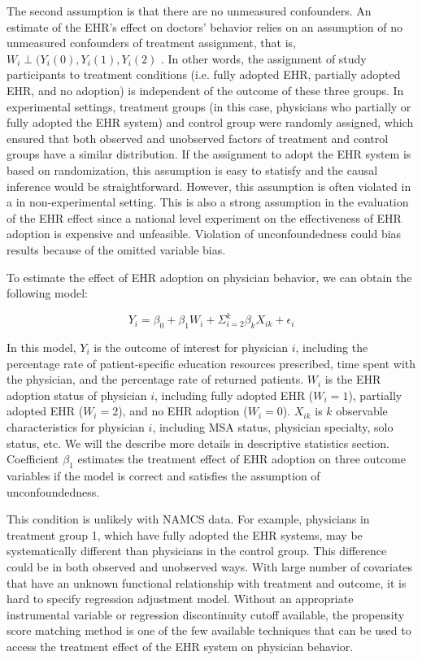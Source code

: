 \documentclass[12pt]{report}
\begin{document}
The second assumption is that there are no unmeasured confounders. An estimate of the EHR's effect on doctors' behavior relies on an assumption of no unmeasured confounders of treatment assignment, that is, $W_i \perp (Y_i(0),Y_i(1),Y_i(2)$ \citep{imbens2008recent}. In other words, the assignment of study participants to treatment conditions (i.e. fully adopted EHR, partially adopted EHR, and no adoption) is independent of the outcome of these three groups. In experimental settings, treatment groups (in this case, physicians who partially or fully adopted the EHR system) and control group were randomly assigned, which ensured that both observed and unobserved factors of treatment and control groups have a similar distribution. If the assignment to adopt the EHR system is based on randomization, this assumption is easy to statisfy and the causal inference would be straightforward. However, this assumption is often violated in a in non-experimental setting. This is also a strong assumption in the evaluation of the EHR effect since a national level experiment on the effectiveness of EHR adoption is expensive and unfeasible. Violation of unconfoundedness could bias results because of the omitted variable bias.

To estimate the effect of EHR adoption on physician behavior, we can obtain the following model:

\begin{equation*}
Y_{i} = \beta_0 + \beta_1 W_i + \Sigma^k_{i=2} \beta_k X_{ik} + \epsilon_{i}
\end{equation*}

In this model, $Y_{i}$ is the outcome of interest for physician $i$, including the percentage rate of patient-specific education resources prescribed, time spent with the physician, and the percentage rate of returned patients. $W_i$ is the EHR adoption status of physician $i$, including fully adopted EHR ($W_i=1$), partially adopted EHR ($W_i=2$), and no EHR adoption ($W_i=0$). $X_{ik}$ is $k$ observable characteristics for physician $i$, including MSA status, physician specialty, solo status, etc. We will the describe more details in descriptive statistics section. Coefficient $\beta_1$ estimates the treatment effect of EHR adoption on three outcome variables if the model is correct and satisfies the assumption of unconfoundedness. 

This condition is unlikely with NAMCS data. For example, physicians in treatment group 1, which have fully adopted the EHR systems, may be systematically different than physicians in the control group. This difference could be in both observed and unobserved ways. With large number of covariates that have an unknown functional relationship with treatment and outcome, it is hard to specify regression adjustment model. Without an appropriate instrumental variable or regression discontinuity cutoff available, the propensity score matching method is one of the few available techniques that can be used to access the treatment effect of the EHR system on physician behavior.
\end{document}
